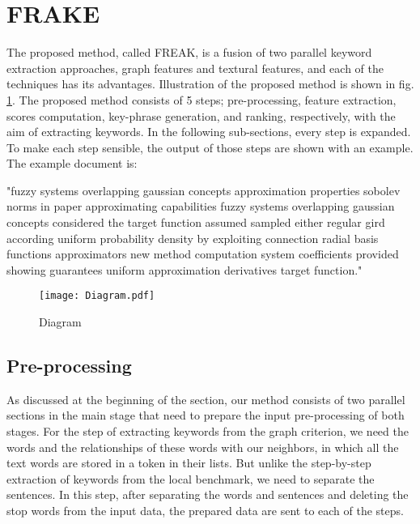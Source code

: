 \documentclass[3p]{elsarticle}
\begin{document}
\section{FRAKE} \label{sec:proposed_method}
The proposed method, called FREAK, is a fusion of two parallel keyword extraction approaches, graph features and textural features, and each of the techniques has its advantages. Illustration of the proposed method is shown in fig. \ref{fig:diagram}. The proposed method consists of 5 steps; pre-processing, feature extraction, scores computation, key-phrase generation, and ranking, respectively, with the aim of extracting keywords. In the following sub-sections, every step is expanded. To make each step sensible, the output of those steps are shown with an example. The example document is: \newline
\begin{tcolorbox}
\small{"fuzzy systems overlapping gaussian concepts approximation properties sobolev norms in paper approximating capabilities fuzzy systems overlapping gaussian concepts considered the target function assumed sampled either regular gird according uniform probability density by exploiting connection radial basis functions approximators new method computation system coefficients provided showing guarantees uniform approximation derivatives target function."}
\end{tcolorbox}

\begin{figure}
    \centering
    \texttt{[image: Diagram.pdf]}
    \caption{Diagram}
    \label{fig:diagram}
\end{figure}

















\subsection{Pre-processing}
As discussed at the beginning of the section, our method consists of two parallel sections in the main stage that need to prepare the input pre-processing of both stages. For the step of extracting keywords from the graph criterion, we need the words and the relationships of these words with our neighbors, in which all the text words are stored in a token in their lists. But unlike the step-by-step extraction of keywords from the local benchmark, we need to separate the sentences. In this step, after separating the words and sentences and deleting the stop words from the input data, the prepared data are sent to each of the steps.
\end{document}
